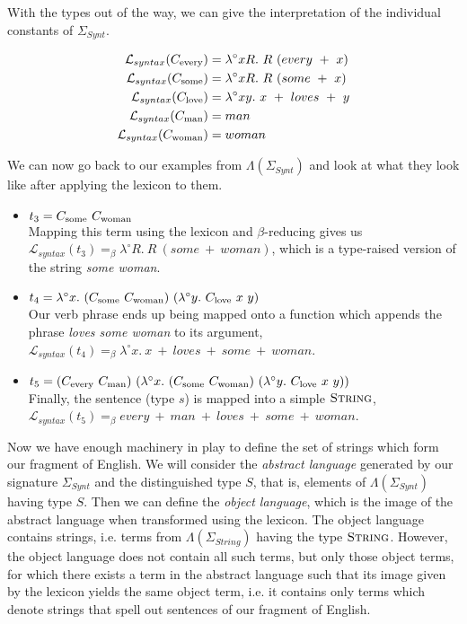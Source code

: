 With the types out of the way, we can give the interpretation of the
individual constants of $\Sigma_{Synt}$.

\begin{align*}
\mathcal{L}_{syntax}(\synt{every}) &= \lambda^{\circ} x R.\ R\ (every\ +\ x) \\
\mathcal{L}_{syntax}(\synt{some}) &= \lambda^{\circ} x R.\ R\ (some\ +\ x) \\
\mathcal{L}_{syntax}(\synt{love}) &= \lambda^{\circ} x y.\ x\ +\ loves\ +\ y \\
\mathcal{L}_{syntax}(\synt{man}) &= man \\
\mathcal{L}_{syntax}(\synt{woman}) &= woman \\
\end{align*}

We can now go back to our examples from $\Lambda(\Sigma_{Synt})$ and
look at what they look like after applying the lexicon to them.

\begin{itemize}
\item $t_3 = \synt{some}\ \synt{woman}$ \\ Mapping this term using the
  lexicon and $\beta$-reducing gives us $\mathcal{L}_{syntax}(t_3)
  =_{\beta} \lambda^{\circ} R.\ R\ (some\ +\ woman)$, which is a
  type-raised version of the string \emph{some woman}.
\item $t_4 = \lambda^{\circ}
  x.\ (C_{\textrm{some}}\ C_{\textrm{woman}})\ (\lambda^{\circ}
  y.\ C_{\textrm{love}}\ x\ y)$ \\ Our verb phrase ends up being mapped onto
  a function which appends the phrase \emph{loves some woman} to its
  argument, $\mathcal{L}_{syntax}(t_4) =_{\beta} \lambda^{\circ}
  x.\ x\ +\ loves\ +\ some\ +\ woman$.
\item $t_5 = (\synt{every}\ \synt{man})\ (\lambda^{\circ}
  x.\ (\synt{some}\ \synt{woman})\ (\lambda^{\circ}
  y.\ \synt{love}\ x\ y))$ \\ Finally, the sentence (type $s$) is mapped
  into a simple $\textsc{String}$, $\mathcal{L}_{syntax}(t_5) =_{\beta}
  every\ +\ man\ +\ loves\ +\ some\ +\ woman$.
\end{itemize}

Now we have enough machinery in play to define the set of strings which
form our fragment of English. We will consider the \emph{abstract
  language} generated by our signature $\Sigma_{Synt}$ and the
distinguished type $S$, that is, elements of $\Lambda(\Sigma_{Synt})$
having type $S$. Then we can define the \emph{object language}, which is
the image of the abstract language when transformed using the
lexicon. The object language contains strings, i.e. terms from
$\Lambda(\Sigma_{String})$ having the type $\textsc{String}$. However,
the object language does not contain all such terms, but only those
object terms, for which there exists a term in the abstract language
such that its image given by the lexicon yields the same object term,
i.e. it contains only terms which denote strings that spell out
sentences of our fragment of English.

